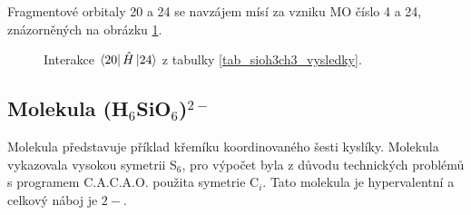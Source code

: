 \documentclass[
  digital, %
  table,   %
  lof,     %
  lot,     %
]{fithesis3}
\begin{document}
Fragmentové orbitaly  20 a 24 se navzájem mísí za vzniku MO číslo 4 a 24, znázorněných na obrázku \ref{obr_sioh3ch3_vysledky_IV}.   
\begin{figure}
\begin{center}
\caption{Interakce $\bra{20}{\hat{H}}\ket{24}$  z tabulky \ref{tab_sioh3ch3_vysledky}.}

\label{obr_sioh3ch3_vysledky_IV}\end{center}
\end{figure} 
  \subsection{Molekula (H$_6$SiO$_6$)$^{2-}$}
  Molekula  představuje příklad křemíku koordinovaného šesti kyslíky. Molekula vykazovala vysokou symetrii S$_6$, pro výpočet byla z důvodu technických problémů s programem C.A.C.A.O. použita symetrie C$_i$. Tato molekula je hypervalentní a celkový náboj je $2-$.
  
\end{document}
